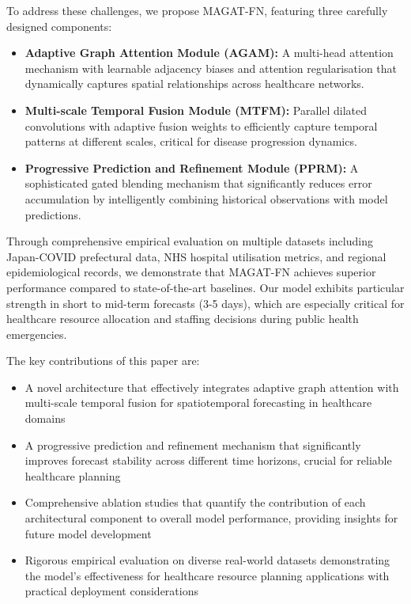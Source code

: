 \documentclass[lettersize, journal]{IEEEtran}
\begin{document}
To address these challenges, we propose MAGAT-FN, featuring three carefully designed components:

\begin{itemize}
\item \textbf{Adaptive Graph Attention Module (AGAM):} A multi-head attention mechanism with learnable adjacency biases and attention regularisation that dynamically captures spatial relationships across healthcare networks.
\item \textbf{Multi-scale Temporal Fusion Module (MTFM):} Parallel dilated convolutions with adaptive fusion weights to efficiently capture temporal patterns at different scales, critical for disease progression dynamics.
\item \textbf{Progressive Prediction and Refinement Module (PPRM):} A sophisticated gated blending mechanism that significantly reduces error accumulation by intelligently combining historical observations with model predictions.
\end{itemize}

Through comprehensive empirical evaluation on multiple datasets including Japan-COVID prefectural data, NHS hospital utilisation metrics, and regional epidemiological records, we demonstrate that MAGAT-FN achieves superior performance compared to state-of-the-art baselines. Our model exhibits particular strength in short to mid-term forecasts (3-5 days), which are especially critical for healthcare resource allocation and staffing decisions during public health emergencies.

The key contributions of this paper are:
\begin{itemize}
\item A novel architecture that effectively integrates adaptive graph attention with multi-scale temporal fusion for spatiotemporal forecasting in healthcare domains
\item A progressive prediction and refinement mechanism that significantly improves forecast stability across different time horizons, crucial for reliable healthcare planning
\item Comprehensive ablation studies that quantify the contribution of each architectural component to overall model performance, providing insights for future model development
\item Rigorous empirical evaluation on diverse real-world datasets demonstrating the model's effectiveness for healthcare resource planning applications with practical deployment considerations
\end{itemize}
\end{document}
